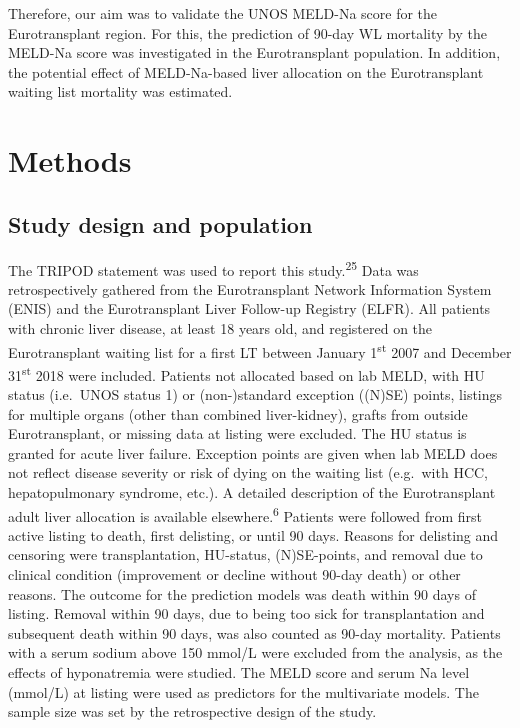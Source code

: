 \documentclass[11pt,english,]{book} %
\begin{document}
Therefore, our aim was to validate the UNOS MELD-Na score for the Eurotransplant region. For this, the prediction of 90-day WL mortality by the MELD-Na score was investigated in the Eurotransplant population. In addition, the potential effect of MELD-Na-based liver allocation on the Eurotransplant waiting list mortality was estimated.

\hypertarget{methods}{%
\section*{Methods}\label{methods}}

\hypertarget{study-design-and-population}{%
\subsection*{Study design and population}\label{study-design-and-population}}

The TRIPOD statement was used to report this study.\textsuperscript{25} Data was retrospectively gathered from the Eurotransplant Network Information System (ENIS) and the Eurotransplant Liver Follow-up Registry (ELFR). All patients with chronic liver disease, at least 18 years old, and registered on the Eurotransplant waiting list for a first LT between January 1\textsuperscript{st} 2007 and December 31\textsuperscript{st} 2018 were included. Patients not allocated based on lab MELD, with HU status (i.e.~UNOS status 1) or (non-)standard exception ((N)SE) points, listings for multiple organs (other than combined liver-kidney), grafts from outside Eurotransplant, or missing data at listing were excluded. The HU status is granted for acute liver failure. Exception points are given when lab MELD does not reflect disease severity or risk of dying on the waiting list (e.g.~with HCC, hepatopulmonary syndrome, etc.). A detailed description of the Eurotransplant adult liver allocation is available elsewhere.\textsuperscript{6} Patients were followed from first active listing to death, first delisting, or until 90 days. Reasons for delisting and censoring were transplantation, HU-status, (N)SE-points, and removal due to clinical condition (improvement or decline without 90-day death) or other reasons. The outcome for the prediction models was death within 90 days of listing. Removal within 90 days, due to being too sick for transplantation and subsequent death within 90 days, was also counted as 90-day mortality. Patients with a serum sodium above 150 mmol/L were excluded from the analysis, as the effects of hyponatremia were studied. The MELD score and serum Na level (mmol/L) at listing were used as predictors for the multivariate models. The sample size was set by the retrospective design of the study.
\end{document}
